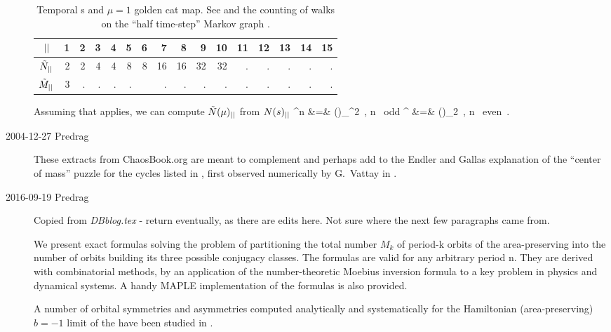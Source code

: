 \begin{description}
\begin{table}
\begin{tabular}{c|rrrrr|rrrrr|rrrrr}
${||}$ &  1 &  2 &  3 &  4 &  5 &
       6 &  7 &  8 &  9 & 10 &
      11 & 12 & 13 & 14 & 15 \\
\hline
$\tilde{N}_{||}$ &   2 &   2 &   4 &   4 &   8 &
         8 & 16 &  16 & 32 &  32 &
        . & . & . & . & . \rule[-1ex]{0ex}{3.5ex} \\
$\tilde{M}_{||}$  &  3 &   . &   . &   . &    . &
             &   . &   . &   . &   . &
           . &  . &   . &   . & .
\end{tabular}
\bigskip
\caption{\label{goldenHen}
    Temporal {\lattstate}s and %
    $\mu=1$  golden cat map.
    See  and the counting of walks on
    the ``half time-step'' Markov graph .
    }
\end{table}


Assuming that  applies, we can compute
$\tilde{N}(\mu)_{{||}}$ from ${N}(s)_{{||}}$
^n &=& (\mu)_{\cl{}}^2
    \,,\quad
n \mbox{ odd}
    ^{\cl{}} &=& (\mu)_{2\cl{}}
    \,,\quad
n \mbox{ even}
\,.
\label{tildejMorbRelHen}
\eea


\item[2004-12-27 Predrag]
These extracts from ChaosBook.org are meant to complement and perhaps add
to the Endler and Gallas explanation of the ``center of mass''
puzzle for the cycles listed in , first observed
numerically by G.~Vattay in .

\item[2016-09-19 Predrag]
     {Copied from {\em DBblog.tex} - return eventually,
    as there are edits here. Not sure where the next few paragraphs came from.}

We present exact formulas solving the problem of partitioning the total
number $M_k$ of period-k orbits of the area-preserving {\HenonMap} into the
number of orbits building its three possible conjugacy classes. The
formulas are valid for any arbitrary period n. They are derived with
combinatorial methods, by an application of the
number-theoretic Moebius inversion formula to a key problem in physics and
dynamical systems. A handy MAPLE implementation of the formulas is also
provided.

A number of orbital symmetries and asymmetries computed analytically and
systematically for the Hamiltonian (area-preserving) $b=-1$ limit of the
{\HenonMap}
have been studied in .


\end{description}
